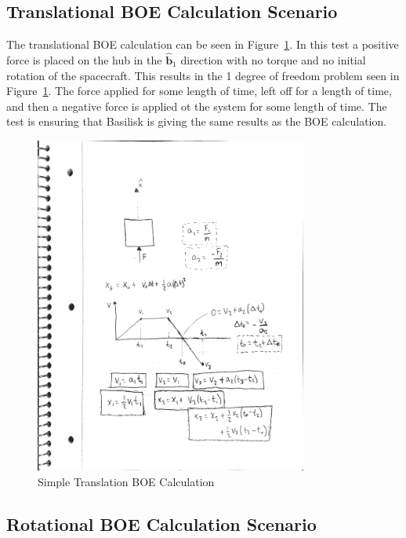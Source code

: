 \subsection{Translational BOE Calculation Scenario}

The translational BOE calculation can be seen in Figure~\ref{fig:BOETrans}. In this test a positive force is placed on the hub in the $\hat{\bm b}_1$ direction with no torque and no initial rotation of the spacecraft. This results in the 1 degree of freedom problem seen in Figure~\ref{fig:BOETrans}. The force applied for some length of time, left off for a length of time, and then a negative force is applied ot the system for some length of time. The test is ensuring that Basilisk is giving the same results as the BOE calculation. 

\begin{figure}[htbp]
	\centerline{
		\includegraphics[width=0.8\textwidth]{Figures/TranslationBOE}}
	\caption{Simple Translation BOE Calculation}
	\label{fig:BOETrans}
\end{figure}

\subsection{Rotational BOE Calculation Scenario}

\clearpage

